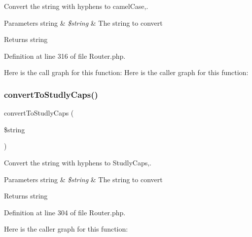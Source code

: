 Convert the string with hyphens to camel\+Case,.


\begin{DoxyParams}[1]{Parameters}
string & {\em \$string} & The string to convert\\
\hline
\end{DoxyParams}
\begin{DoxyReturn}{Returns}
string 
\end{DoxyReturn}


Definition at line 316 of file Router.\+php.

Here is the call graph for this function\+:
Here is the caller graph for this function\+:
\mbox{\label{class_zest_1_1_router_1_1_router_a6201cf73444ddfadfca25d437f49fd1b}} 
\subsubsection{\texorpdfstring{convert\+To\+Studly\+Caps()}{convertToStudlyCaps()}}
{\footnotesize\ttfamily convert\+To\+Studly\+Caps (\begin{DoxyParamCaption}\item[{}]{\$string }\end{DoxyParamCaption})\hspace{0.3cm}{\ttfamily [protected]}}

Convert the string with hyphens to Studly\+Caps,.


\begin{DoxyParams}[1]{Parameters}
string & {\em \$string} & The string to convert\\
\hline
\end{DoxyParams}
\begin{DoxyReturn}{Returns}
string 
\end{DoxyReturn}


Definition at line 304 of file Router.\+php.

Here is the caller graph for this function\+:
\mbox{\label{class_zest_1_1_router_1_1_router_a893e99daba2c70ee898cb9c89a8e5e81}} 
